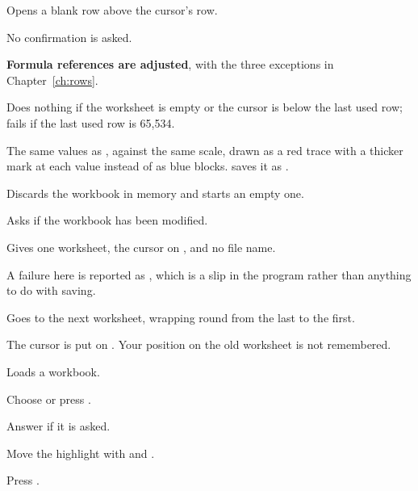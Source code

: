 
Opens a blank row above the cursor's row.

\begin{ccsteps}
\item No confirmation is asked.
\item \textbf{Formula references are adjusted}, with the three exceptions in
Chapter~\ref{ch:rows}.
\item Does nothing if the worksheet is empty or the cursor is below the last
used row; fails if the last used row is 65,534.
\end{ccsteps}


The same values as , against the same scale, drawn as a red
trace with a thicker mark at each value instead of as blue blocks. 
saves it as .


Discards the workbook in memory and starts an empty one.

\begin{ccsteps}
\item Asks  if the workbook has been modified.
\item Gives one worksheet, the cursor on , and no file name.
\item A failure here is reported as , which is a slip in the
program rather than anything to do with saving.
\end{ccsteps}


Goes to the next worksheet, wrapping round from the last to the first.

\begin{ccsteps}
\item The cursor is put on . Your position on the old worksheet is
not remembered.
\end{ccsteps}


Loads a  workbook.

\begin{ccprocedure}[]
\item Choose  or press .
\item Answer  if it is asked.
\item Move the highlight with \key{$\uparrow$} and \key{$\downarrow$}.
\item Press .
\end{ccprocedure}

